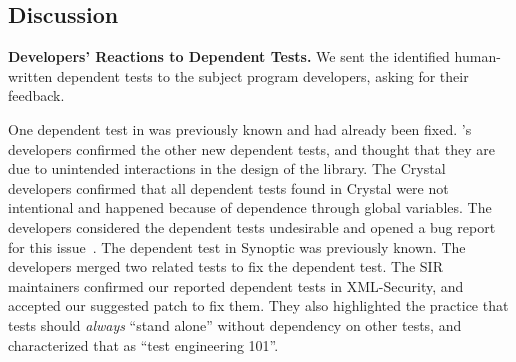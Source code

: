 


\subsection{Discussion}
\label{sec:expdiscussion}


\noindent \textbf{Developers' Reactions to Dependent Tests.}
We sent the identified human-written dependent tests to the
subject program developers, asking for their feedback.

One dependent test in \jt was previously known
and had already been fixed. \jt's
developers confirmed the other new dependent
tests, and thought that they are due to unintended interactions
in the design of the library.
%
The Crystal developers confirmed that all dependent tests
found in Crystal were not intentional and happened because of dependence
through global variables. The developers considered the
dependent tests undesirable and opened a bug report for
this issue~\cite{crystalbugreport}.
%
The dependent test in Synoptic was previously known.
The developers merged two related tests to fix
the dependent test.
%
The SIR~\cite{sir} maintainers confirmed our reported dependent
tests in XML-Security, and accepted our
suggested patch to fix them. They also highlighted the practice
that tests should \textit{always} ``stand alone''
without dependency on other tests, and characterized that as
``test engineering 101''. 



